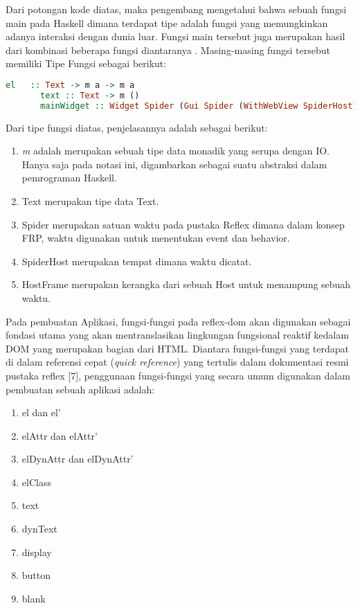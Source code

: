 \documentclass[pi.tex]{subfile}
\begin{document}
  \hspace{10pt}Dari potongan kode diatas, maka pengembang mengetahui bahwa sebuah fungsi main pada Haskell dimana terdapat tipe  adalah fungsi yang memungkinkan adanya interaksi dengan dunia luar. Fungsi main tersebut juga merupakan hasil dari kombinasi beberapa fungsi diantaranya . Masing-masing fungsi tersebut memiliki Tipe Fungsi sebagai berikut:\\ 
    \begin{lstlisting}[language=Haskell]
       el   :: Text -> m a -> m a
       text :: Text -> m ()
       mainWidget :: Widget Spider (Gui Spider (WithWebView SpiderHost) (HostFrame Spider)) () -> IO ()
    \end{lstlisting}
Dari tipe fungsi diatas, penjelasannya adalah sebagai berikut:
    \begin{enumerate}[leftmargin=1.65cm]
    \item \emph{m} adalah merupakan sebuah tipe data monadik yang serupa dengan IO. Hanya saja pada notasi ini,  digambarkan sebagai suatu abstraksi dalam pemrograman Haskell.
    \item Text merupakan tipe data Text.
    \item Spider merupakan satuan waktu pada pustaka Reflex dimana dalam konsep FRP, waktu digunakan untuk menentukan event dan behavior.
    \item SpiderHost merupakan tempat dimana waktu dicatat.
    \item HostFrame merupakan kerangka dari sebuah Host untuk menampung sebuah waktu.
    \end{enumerate}

    \hspace{10pt}Pada pembuatan Aplikasi, fungsi-fungsi pada reflex-dom akan digunakan sebagai fondasi utama yang akan mentranslasikan lingkungan fungsional reaktif kedalam DOM yang merupakan bagian dari HTML. Diantara fungsi-fungsi yang terdapat di dalam referensi cepat (\emph{quick reference}) yang tertulis dalam dokumentasi resmi pustaka reflex [7], penggunaan fungsi-fungsi yang secara umum digunakan dalam pembuatan sebuah aplikasi adalah:

    \begin{enumerate}[leftmargin=1.65cm]
    \item el dan el'
    \item elAttr dan elAttr'
    \item elDynAttr dan elDynAttr'
    \item elClass
    \item text
    \item dynText
    \item display
    \item button
    \item blank
    \end{enumerate}
\end{document}
